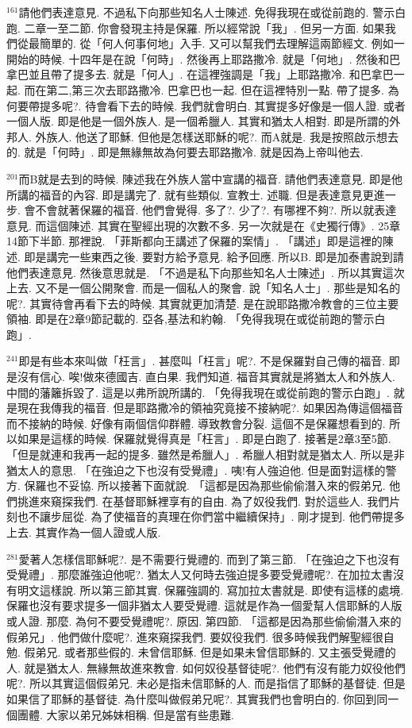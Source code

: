 \documentclass{book}
\begin{document}
$^{161}$請他們表達意見.
不過私下向那些知名人士陳述.
免得我現在或從前跑的.
警示白跑.
二章一至二節.
你會發現主持是保羅.
所以經常說「我」.
但另一方面.
如果我們從最簡單的.
從「何人何事何地」入手.
又可以幫我們去理解這兩節經文.
例如一開始的時候.
十四年是在說「何時」.
然後再上耶路撒冷.
就是「何地」.
然後和巴拿巴並且帶了提多去.
就是「何人」.
在這裡強調是「我」上耶路撒冷.
和巴拿巴一起.
而在第二,第三次去耶路撒冷.
巴拿巴也一起.
但在這裡特別一點.
帶了提多.
為何要帶提多呢?.
待會看下去的時候.
我們就會明白.
其實提多好像是一個人證.
或者一個人版.
即是他是一個外族人.
是一個希臘人.
其實和猶太人相對.
即是所謂的外邦人.
外族人.
他送了耶穌.
但他是怎樣送耶穌的呢?.
而A就是.
我是按照啟示想去的.
就是「何時」.
即是無緣無故為何要去耶路撒冷.
就是因為上帝叫他去.

$^{201}$而B就是去到的時候.
陳述我在外族人當中宣講的福音.
請他們表達意見.
即是他所講的福音的內容.
即是講完了.
就有些類似.
宣教士.
述職.
但是表達意見更進一步.
會不會就著保羅的福音.
他們會覺得.
多了?.
少了?.
有哪裡不夠?.
所以就表達意見.
而這個陳述.
其實在聖經出現的次數不多.
另一次就是在《史獨行傳》.
25章14節下半節.
那裡說.
「菲斯都向王講述了保羅的案情」.
「講述」即是這裡的陳述.
即是講完一些東西之後.
要對方給予意見.
給予回應.
所以B.
即是加泰書說到請他們表達意見.
然後意思就是.
「不過是私下向那些知名人士陳述」.
所以其實這次上去.
又不是一個公開聚會.
而是一個私人的聚會.
說「知名人士」.
那些是知名的呢?.
其實待會再看下去的時候.
其實就更加清楚.
是在說耶路撒冷教會的三位主要領袖.
即是在2章9節記載的.
亞各,基法和約翰.
「免得我現在或從前跑的警示白跑」.

$^{241}$即是有些本來叫做「枉言」.
甚麼叫「枉言」呢?.
不是保羅對自己傳的福音.
即是沒有信心.
唉!做來德國吉.
直白果.
我們知道.
福音其實就是將猶太人和外族人.
中間的藩籬拆毀了.
這是以弗所說所講的.
「免得我現在或從前跑的警示白跑」.
就是現在我傳我的福音.
但是耶路撒冷的領袖究竟接不接納呢?.
如果因為傳這個福音而不接納的時候.
好像有兩個信仰群體.
導致教會分裂.
這個不是保羅想看到的.
所以如果是這樣的時候.
保羅就覺得真是「枉言」.
即是白跑了.
接著是2章3至5節.
「但是就連和我再一起的提多.
雖然是希臘人」.
希臘人相對就是猶太人.
所以是非猶太人的意思.
「在強迫之下也沒有受覺禮」.
咦!有人強迫他.
但是面對這樣的警方.
保羅也不妥協.
所以接著下面就說.
「這都是因為那些偷偷潛入來的假弟兄.
他們挑進來窺探我們.
在基督耶穌裡享有的自由.
為了奴役我們.
對於這些人.
我們片刻也不讓步屈從.
為了使福音的真理在你們當中繼續保持」.
剛才提到.
他們帶提多上去.
其實作為一個人證或人版.

$^{281}$愛著人怎樣信耶穌呢?.
是不需要行覺禮的.
而到了第三節.
「在強迫之下也沒有受覺禮」.
那麼誰強迫他呢?.
猶太人又何時去強迫提多要受覺禮呢?.
在加拉太書沒有明文這樣說.
所以第三節其實.
保羅強調的.
寫加拉太書就是.
即使有這樣的處境.
保羅也沒有要求提多一個非猶太人要受覺禮.
這就是作為一個愛幫人信耶穌的人版或人證.
那麼.
為何不要受覺禮呢?.
原因.
第四節.
「這都是因為那些偷偷潛入來的假弟兄」.
他們做什麼呢?.
進來窺探我們.
要奴役我們.
很多時候我們解聖經很自勉.
假弟兄.
或者那些假的.
未曾信耶穌.
但是如果未曾信耶穌的.
又主張受覺禮的人.
就是猶太人.
無緣無故進來教會.
如何奴役基督徒呢?.
他們有沒有能力奴役他們呢?.
所以其實這個假弟兄.
未必是指未信耶穌的人.
而是指信了耶穌的基督徒.
但是如果信了耶穌的基督徒.
為什麼叫做假弟兄呢?.
其實我們也會明白的.
你回到同一個團體.
大家以弟兄姊妹相稱.
但是當有些患難.
\end{document}
